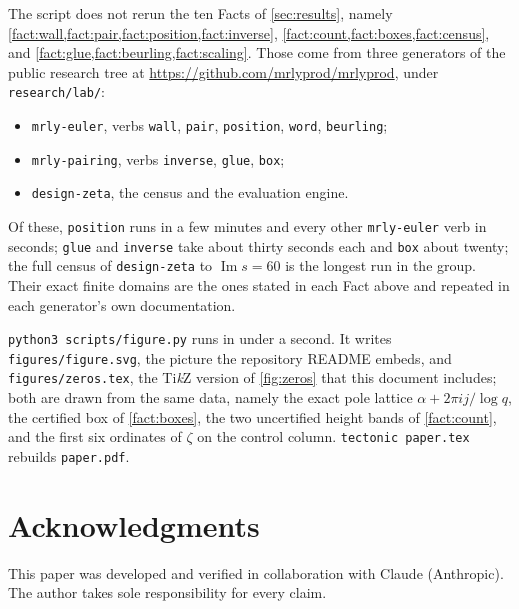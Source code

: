 \documentclass[11pt]{amsart}
\theoremstyle{definition}
\theoremstyle{remark}
\begin{document}
\begin{sloppypar}
The script does not rerun the ten Facts of \cref{sec:results}, namely \cref{fact:wall,fact:pair,fact:position,fact:inverse}, \cref{fact:count,fact:boxes,fact:census}, and \cref{fact:glue,fact:beurling,fact:scaling}. Those come from three generators of the public research tree at \url{https://github.com/mrlyprod/mrlyprod}, under \texttt{research/lab/}:
\end{sloppypar}
\begin{itemize}
\item \texttt{mrly-euler}, verbs \texttt{wall}, \texttt{pair}, \texttt{position}, \texttt{word}, \texttt{beurling};
\item \texttt{mrly-pairing}, verbs \texttt{inverse}, \texttt{glue}, \texttt{box};
\item \texttt{design-zeta}, the census and the evaluation engine.
\end{itemize}
Of these, \texttt{position} runs in a few minutes and every other \texttt{mrly-euler} verb in seconds; \texttt{glue} and \texttt{inverse} take about thirty seconds each and \texttt{box} about twenty; the full census of \texttt{design-zeta} to $\operatorname{Im} s = 60$ is the longest run in the group. Their exact finite domains are the ones stated in each Fact above and repeated in each generator's own documentation.

\texttt{python3 scripts/figure.py} runs in under a second. It writes \texttt{figures/figure.svg}, the picture the repository README embeds, and \texttt{figures/zeros.tex}, the Ti\emph{k}Z version of \cref{fig:zeros} that this document includes; both are drawn from the same data, namely the exact pole lattice $\alpha + 2\pi i j/\log q$, the certified box of \cref{fact:boxes}, the two uncertified height bands of \cref{fact:count}, and the first six ordinates of $\zeta$ on the control column. \texttt{tectonic paper.tex} rebuilds \texttt{paper.pdf}.

\section*{Acknowledgments}

This paper was developed and verified in collaboration with Claude (Anthropic). The author takes sole responsibility for every claim.
\end{document}
